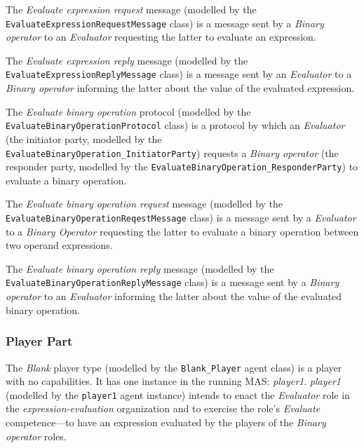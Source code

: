 The \textit{Evaluate expression request} message (modelled by the \texttt{EvaluateExpressionRequestMessage} class) is a message sent by a \textit{Binary operator} to an \textit{Evaluator} requesting the latter to evaluate an expression.

The \textit{Evaluate expression reply} message (modelled by the \texttt{EvaluateExpressionReplyMessage} class) is a message sent by an \textit{Evaluator} to a \textit{Binary operator} informing the latter about the value of the evaluated expression.

The \textit{Evaluate binary operation} protocol (modelled by the \texttt{EvaluateBinaryOperationProtocol} class) is a protocol by which an \textit{Evaluator} (the initiator party, modelled by the \texttt{EvaluateBinaryOperation\_InitiatorParty}) requests a \textit{Binary operator} (the responder party, modelled by the \texttt{EvaluateBinaryOperation\_ResponderParty}) to evaluate a binary operation.

The \textit{Evaluate binary operation request} message (modelled by the \texttt{EvaluateBinaryOperationReqestMessage} class) is a message sent by a \textit{Evaluator} to a \textit{Binary Operator} requesting the latter to evaluate a binary operation between two operand expressions.

The \textit{Evaluate binary operation reply} message (modelled by the \texttt{EvaluateBinaryOperationReplyMessage} class) is a message sent by a \textit{Binary operator} to an \textit{Evaluator} informing the latter about the value of the evaluated binary operation.

\subsubsection*{Player Part}

The \textit{Blank} player type (modelled by the \texttt{Blank\_Player} agent class) is a player with no capabilities.
It has one instance in the running MAS: \textit{player1}.
\textit{player1} (modelled by the \texttt{player1} agent instance) intends to enact the \textit{Evaluator} role in the \textit{expression-evaluation} organization and to exercise the role's \textit{Evaluate} competence---to have an expression evaluated by the players of the \textit{Binary operator} roles.

